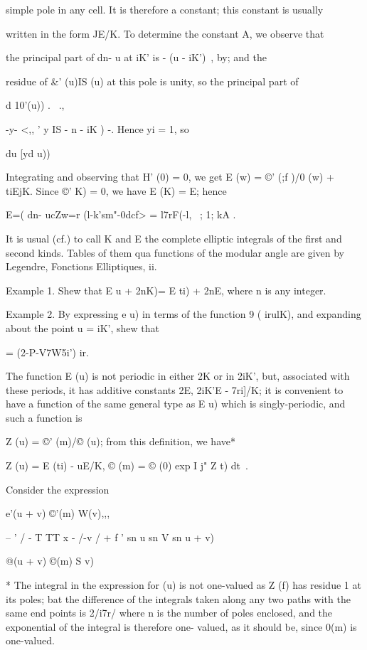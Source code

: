 simple pole in any cell. It is therefore a constant; this constant is
usually

written in the form JE/K. To determine the constant A, we observe that

the principal part of dn- u at iK' is - (u - iK')~, by; and
the

residue of \&' (u)IS (u) at this pole is unity, so the principal part
of

d 10'(u)) . \ .,

-y- <,, ' y IS - n - iK ) -. Hence yi = 1, so

du [yd u))

Integrating and observing that H' (0) = 0, we get E (w) = ©' (;f )/0
(w) + tiEjK. Since ©' K) = 0, we have E (K) = E; hence

E=( dn- ucZw=r (l-k'sm"-0dcf> = l7rF(-l, ~; 1; kA .

It is usual (cf.) to call K and E the complete elliptic
integrals of the first and second kinds. Tables of them qua functions
of the modular angle are given by Legendre, Fonctions Elliptiques, ii.

Example 1. Shew that E u + 2nK)= E ti) + 2nE, where n is any integer.

Example 2. By expressing e u) in terms of the function 9 ( irulK), and
expanding about the point u = iK', shew that

 = (2-P-V7W5i') ir.


The function E (u) is not periodic in either 2K or in 2iK', but,
associated with these periods, it has additive constants 2E, 2iK'E -
7ri]/K; it is convenient to have a function of the same general type
as E u) which is singly-periodic, and such a function is

Z (u) = ©' (m)/© (u); from this definition, we have*

Z (u) = E (ti) - uE/K, © (m) = © (0) exp I j" Z t) dt\ .


Consider the expression

e'(u + v) ©'(m) W(v),,,

-- ' / - T TT x - /-v / + f ' sn u sn V sn u + v)

@(u + v) ©(m) S v)

* The integral in the expression for (u) is not one-valued as Z (f)
has residue 1 at its poles; bat the difference of the integrals taken
along any two paths with the same end points is 2/i7r/ where n is the
number of poles enclosed, and the exponential of the integral is
therefore one- valued, as it should be, since 0(m) is one-valued.

